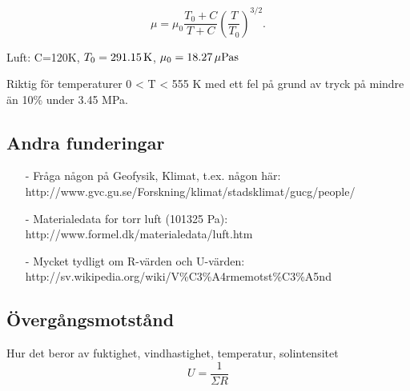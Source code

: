 \begin{equation}
{\mu} = {\mu}_0 \frac {T_0+C} {T + C} \left (\frac {T} {T_0} \right )^{3/2}.
\end{equation}

Luft: C=120K, $T_0=\unit[291.15]{K}$, $\mu_0=\unit[18.27]{\mu Pa s}$

Riktig för temperaturer 0 < T < 555 K med ett fel på grund av tryck på mindre än 10\% under 3.45 MPa.



\subsection{Andra funderingar}
\begin{itemize}
\item[-] Fråga någon på Geofysik, Klimat, t.ex. någon här: \\
http://www.gvc.gu.se/Forskning/klimat/stadsklimat/gucg/people/
\item[-] Materialedata for torr luft (101325 Pa): http://www.formel.dk/materialedata/luft.htm
\item[-] Mycket tydligt om R-värden och U-värden: \\
http://sv.wikipedia.org/wiki/V\%C3\%A4rmemotst\%C3\%A5nd
\end{itemize}



\subsection{Övergångsmotstånd}
Hur det beror av fuktighet, vindhastighet, temperatur, solintensitet
\begin{equation}
U=\frac{1}{\Sigma R}
\end{equation}
